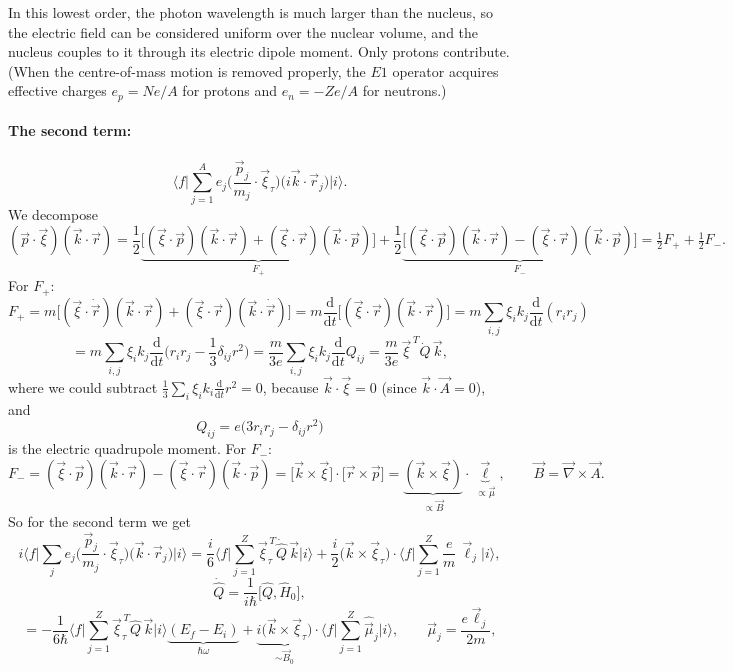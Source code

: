 \documentclass[11pt,a4paper]{article}
\newcommand{\op}[1]{\hat{#1}}
\newcommand{\ud}{\mathrm{d}}
\begin{document}
In this lowest order, the photon wavelength is much larger than the nucleus, so the electric field can be considered uniform over the nuclear volume, and the nucleus couples to it through its electric dipole moment. Only protons contribute. (When the centre-of-mass motion is removed properly, the $E1$ operator acquires effective charges $e_p=Ne/A$ for protons and $e_n=-Ze/A$ for neutrons.)


\paragraph{The second term:}
\[
\Big\langle f\Big|\sum_{j=1}^Ae_j\Big(\frac{\vec p_j}{m_j}\cdot\vec\xi_\tau\Big)\big(i\vec k\cdot\vec r_j\big)\Big|i\Big\rangle .
\]
We decompose
\[
(\vec p\cdot\vec\xi)(\vec k\cdot\vec r)
=\frac12\underbrace{\big[(\vec\xi\cdot\vec p)(\vec k\cdot\vec r)+(\vec\xi\cdot\vec r)(\vec k\cdot\vec p)\big]}_{F_+}
+\frac12\underbrace{\big[(\vec\xi\cdot\vec p)(\vec k\cdot\vec r)-(\vec\xi\cdot\vec r)(\vec k\cdot\vec p)\big]}_{F_-}
=\tfrac12F_++\tfrac12F_- .
\]
For $F_+$:
\[
F_+=m\big[(\vec\xi\cdot\dot{\vec r})(\vec k\cdot\vec r)+(\vec\xi\cdot\vec r)(\vec k\cdot\dot{\vec r})\big]
=m\frac{\ud}{\ud t}\big[(\vec\xi\cdot\vec r)(\vec k\cdot\vec r)\big]
=m\sum_{i,j}\xi_ik_j\frac{\ud}{\ud t}(r_ir_j)
\]
\[
=m\sum_{i,j}\xi_ik_j\frac{\ud}{\ud t}\Big(r_ir_j-\frac13\delta_{ij}r^2\Big)
=\frac{m}{3e}\sum_{i,j}\xi_ik_j\frac{\ud}{\ud t}Q_{ij}
=\frac{m}{3e}\,\vec\xi^{\,T}\dot Q\,\vec k ,
\]
where we could subtract $\frac13\sum_i\xi_ik_i\frac{\ud}{\ud t}r^2=0$, because $\vec k\cdot\vec\xi=0$ (since $\vec k\cdot\vec A=0$), and
\[
Q_{ij}=e\big(3r_ir_j-\delta_{ij}r^2\big)
\]
is the electric quadrupole moment. For $F_-$:
\[
F_-=(\vec\xi\cdot\vec p)(\vec k\cdot\vec r)-(\vec\xi\cdot\vec r)(\vec k\cdot\vec p)
=\big[\vec k\times\vec\xi\big]\cdot\big[\vec r\times\vec p\big]
=\underbrace{(\vec k\times\vec\xi)}_{\propto\vec B}\cdot\underbrace{\vec\ell}_{\propto\vec\mu},
\qquad \vec B=\vec\nabla\times\vec A .
\]
So for the second term we get
\[
i\Big\langle f\Big|\sum_je_j\Big(\frac{\vec p_j}{m_j}\cdot\vec\xi_\tau\Big)\big(\vec k\cdot\vec r_j\big)\Big|i\Big\rangle
=\frac i6\Big\langle f\Big|\sum_{j=1}^Z\vec\xi^{\,T}_\tau\dot{\op Q}\,\vec k\Big|i\Big\rangle
+\frac i2\big(\vec k\times\vec\xi_\tau\big)\cdot\Big\langle f\Big|\sum_{j=1}^Z\frac em\,\vec\ell_j\Big|i\Big\rangle ,
\]
\[
\dot{\op Q}=\frac{1}{i\hbar}\big[\op Q,\op H_0\big],
\]
\[
=-\frac{1}{6\hbar}\Big\langle f\Big|\sum_{j=1}^Z\vec\xi^{\,T}_\tau\op Q\,\vec k\Big|i\Big\rangle\underbrace{(E_f-E_i)}_{\hbar\omega}
+\underbrace{i\big(\vec k\times\vec\xi_\tau\big)}_{\sim\vec B_0}\cdot\Big\langle f\Big|\sum_{j=1}^Z\op{\vec\mu}_j\Big|i\Big\rangle,
\qquad \vec\mu_j=\frac{e\vec\ell_j}{2m},
\]
\end{document}
